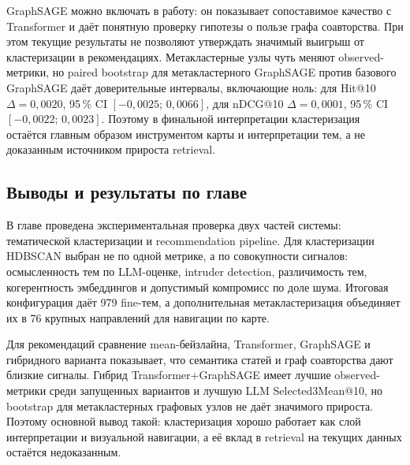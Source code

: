 GraphSAGE можно включать в работу: он показывает сопоставимое качество с Transformer и даёт
понятную проверку гипотезы о пользе графа соавторства. При этом текущие результаты не позволяют
утверждать значимый выигрыш от кластеризации в рекомендациях. Метакластерные узлы чуть меняют
observed-метрики, но paired bootstrap для метакластерного GraphSAGE против базового GraphSAGE
даёт доверительные интервалы, включающие ноль: для Hit@10
$\Delta = 0{,}0020$, 95\,\% CI $[-0{,}0025;\,0{,}0066]$, для nDCG@10
$\Delta = 0{,}0001$, 95\,\% CI $[-0{,}0022;\,0{,}0023]$. Поэтому в финальной интерпретации
кластеризация остаётся главным образом инструментом карты и интерпретации тем, а не доказанным
источником прироста retrieval.

\subsection{Выводы и результаты по главе}

В главе проведена экспериментальная проверка двух частей системы: тематической кластеризации и
recommendation pipeline. Для кластеризации HDBSCAN выбран не по одной метрике, а по совокупности
сигналов: осмысленность тем по LLM-оценке, intruder detection, различимость тем, когерентность
эмбеддингов и допустимый компромисс по доле шума. Итоговая конфигурация даёт 979 fine-тем, а
дополнительная метакластеризация объединяет их в 76 крупных направлений для навигации по карте.

Для рекомендаций сравнение mean-бейзлайна, Transformer, GraphSAGE и гибридного варианта показывает,
что семантика статей и граф соавторства дают близкие сигналы. Гибрид Transformer+GraphSAGE имеет
лучшие observed-метрики среди запущенных вариантов и лучшую LLM Selected3Mean@10, но bootstrap
для метакластерных графовых узлов не даёт значимого прироста. Поэтому основной вывод такой:
кластеризация хорошо работает как слой интерпретации и визуальной навигации, а её вклад в retrieval
на текущих данных остаётся недоказанным.
